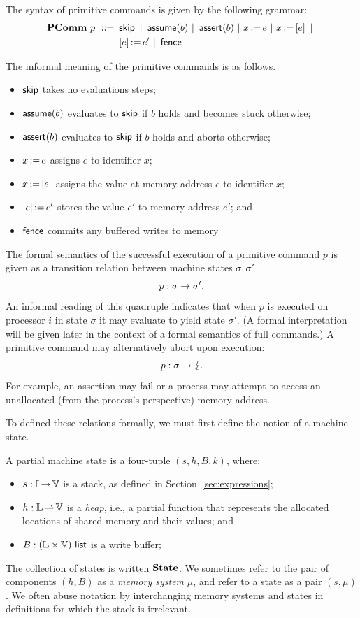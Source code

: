 \documentclass[11pt]{report}
\begin{document}
The syntax of primitive commands is given by the following grammar: \begin{align*} \mathbf{PComm}~p ~::=~ & \operatorname{\mathsf{skip}} ~|~ \operatorname{\mathsf{assume}}(b) ~|~ \operatorname{\mathsf{assert}}(b) ~|~ x \operatorname{:\!=} e ~|~ x \operatorname{:\!=} \left[ e \right] ~|~ \\ 
    & \left[ e \right] \operatorname{:\!=} e' ~|~ \operatorname{\mathsf{fence}}
\end{align*}

The informal meaning of the primitive commands is as follows. \begin{itemize}
    \item $\operatorname{\mathsf{skip}}$ takes no evaluations steps;
    \item $\operatorname{\mathsf{assume}}(b)$ evaluates to $\operatorname{\mathsf{skip}}$ if $b$ holds and becomes stuck otherwise; 
    \item $\operatorname{\mathsf{assert}}(b)$ evaluates to $\operatorname{\mathsf{skip}}$ if $b$ holds and aborts otherwise;
    \item $x \operatorname{:\!=} e$ assigns $e$ to identifier $x$; 
    \item $x \operatorname{:\!=} \left[ e \right]$ assigns the value at memory address $e$ to identifier $x$; 
    \item $\left[ e \right] \operatorname{:\!=} e'$ stores the value $e'$ to memory address $e'$; and
    \item $\operatorname{\mathsf{fence}}$ commits any buffered writes to memory 
\end{itemize}

The formal semantics of the successful execution of a primitive command $p$ is given as a transition relation between machine states $\sigma,\sigma'$ \[ p : \sigma \rightarrow \sigma'. \] An informal reading of this quadruple indicates that when $p$ is executed on processor $i$ in state $\sigma$ it may evaluate to yield state $\sigma'$. (A formal interpretation will be given later in the context of a formal semantics of full commands.) A primitive command may alternatively abort upon execution: \[ p : \sigma \rightarrow \lightning. \] For example, an assertion may fail or a process may attempt to access an unallocated (from the process's perspective) memory address. 

To defined these relations formally, we must first define the notion of a machine state. 

\begin{definition}
A partial machine state is a four-tuple $(s,h,B,k)$, where: \begin{itemize}
    \item $s : \mathbb{I} \operatorname{\rightarrow} \mathbb{V}$ is a stack, as defined in Section~\ref{sec:expressions};
    \item $h : \mathbb{L} \operatorname{\rightharpoonup} \mathbb{V}$ is a \emph{heap}, i.e., a partial function that represents the allocated locations of shared memory and their values; and 
    \item $B : (\mathbb{L} \times \mathbb{V})~\mathsf{list}$ is a write buffer;
\end{itemize}
\end{definition} 
The collection of states is written $\mathbf{State}$. We sometimes refer to the pair of components $(h,B)$ as a \emph{memory system} $\mu$, and refer to a state as a pair $(s,\mu)$. We often abuse notation by interchanging memory systems and states in definitions for which the stack is irrelevant. 
\end{document}
